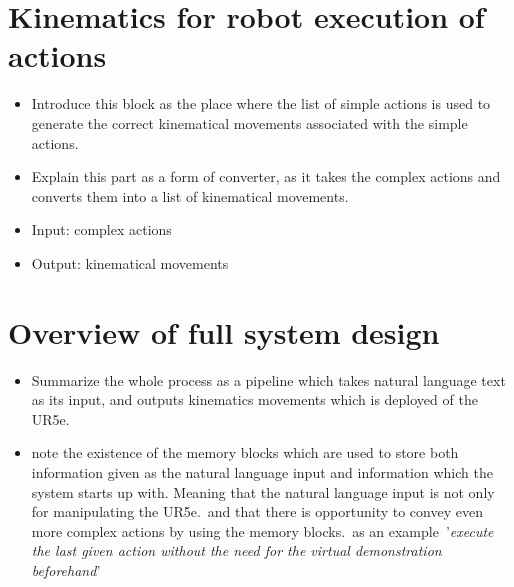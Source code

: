 \section{Kinematics for robot execution of actions}\label{sec:Integration_kin_for_robot}
\begin{itemize}
    \item Introduce this block as the place where the list of simple actions is used to generate the correct kinematical movements associated with the simple actions.
    \item Explain this part as a form of converter, as it takes the complex actions and converts them into a list of kinematical movements.
    \item Input: complex actions
    \item Output: kinematical movements
\end{itemize}


\section{Overview of full system design}\label{sec:Integration_overview}
\begin{itemize}
    \item Summarize the whole process as a pipeline which takes natural language text as its input, and outputs kinematics movements which is deployed of the UR5e.
    \item note the existence of the memory blocks which are used to store both information given as the natural language input and information which the system starts up with. Meaning that the natural language input is not only for manipulating the UR5e.\ and that there is opportunity to convey even more complex actions by using the memory blocks.\ as an example\ '\textit{execute the last given action without the need for the virtual demonstration beforehand}'
\end{itemize}
